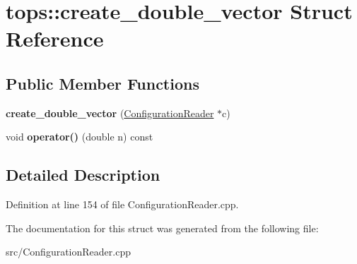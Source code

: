 \hypertarget{structtops_1_1create__double__vector}{}\section{tops\+:\+:create\+\_\+double\+\_\+vector Struct Reference}
\label{structtops_1_1create__double__vector}
\subsection*{Public Member Functions}
\begin{DoxyCompactItemize}
\item 
\mbox{\label{structtops_1_1create__double__vector_a9d3c4f4994d39902501eb31b2d5b781a}} 
{\bfseries create\+\_\+double\+\_\+vector} (\hyperlink{classtops_1_1ConfigurationReader}{Configuration\+Reader} $\ast$c)
\item 
\mbox{\label{structtops_1_1create__double__vector_affc549bb9834f748c3bd82b6c15b3a1f}} 
void {\bfseries operator()} (double n) const
\end{DoxyCompactItemize}


\subsection{Detailed Description}


Definition at line 154 of file Configuration\+Reader.\+cpp.



The documentation for this struct was generated from the following file\+:\begin{DoxyCompactItemize}
\item 
src/Configuration\+Reader.\+cpp\end{DoxyCompactItemize}
